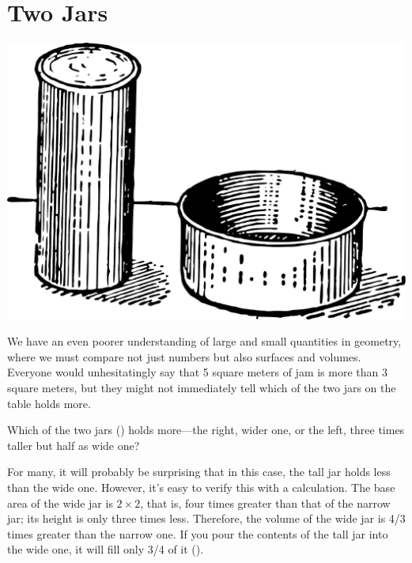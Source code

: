 \section{Two Jars}
\label{sec-11.4}

\begin{marginfigure}%
\centering
\includegraphics[width=\textwidth]{figures/ch-11/fig-165.pdf}
\end{marginfigure}

We have an even poorer understanding of large and small quantities in geometry, where we must compare not just numbers but also surfaces and volumes. Everyone would unhesitatingly say that 5 square meters of jam is more than 3 square meters, but they might not immediately tell which of the two jars on the table holds more.


\ques Which of the two jars () holds more—the right, wider one, or the left, three times taller but half as wide one?

\ans For many, it will probably be surprising that in this case, the tall jar holds less than the wide one. However, it’s easy to verify this with a calculation. The base area of the wide jar is $2 \times 2$, that is, four times greater than that of the narrow jar; its height is only three times less. Therefore, the volume of the wide jar is 4/3 times greater than the narrow one. If you pour the contents of the tall jar into the wide one, it will fill only 3/4 of it ().


